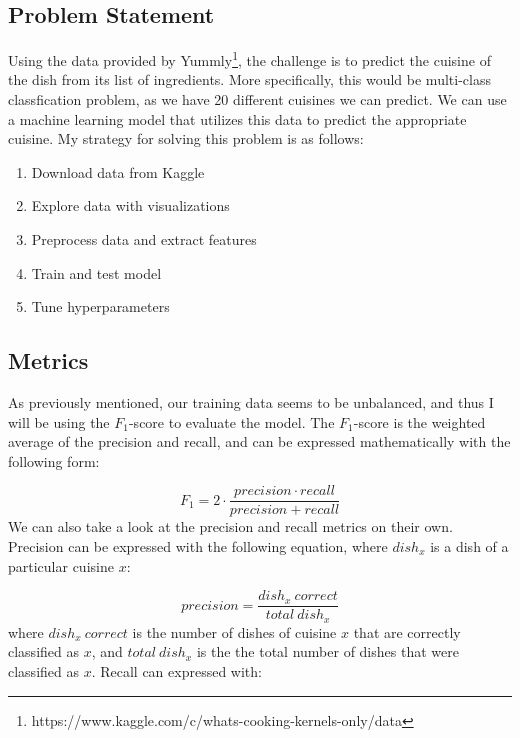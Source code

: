 \documentclass[12pt]{article}
\begin{document}
\subsection{Problem Statement}
Using the data provided by Yummly\footnote{https://www.kaggle.com/c/whats-cooking-kernels-only/data}, the challenge is to predict the cuisine of the dish from its list of ingredients. More specifically, this would be multi-class classfication problem, as we have 20 different cuisines we can predict. We can use a machine learning model that utilizes this data to predict the appropriate cuisine.
\newline
\newline
%
My strategy for solving this problem is as follows:
\begin{enumerate}[label*=\arabic*.]
\item Download data from Kaggle
\item Explore data with visualizations
\item Preprocess data and extract features
\item Train and test model
\item Tune hyperparameters
\end{enumerate}

\subsection{Metrics}
As previously mentioned, our training data seems to be unbalanced, and thus I will be using the $F_1$-score to evaluate the model. The $F_1$-score is the weighted average of the precision and recall, and can be expressed mathematically with the following form:

\begin{equation}
F_1 = 2 \cdot \frac{precision \cdot recall}{precision+recall}
\end{equation}
%
We can also take a look at the precision and recall metrics on their own. Precision can be expressed with the following equation, where $dish_x$ is a dish of a particular cuisine $x$:

\begin{equation}
precision = \frac{\textit{$dish_x\: correct$}}{\textit{$total\: dish_x$}}
\end{equation}
%
where $dish_x\: correct$ is the number of dishes of cuisine $x$ that are correctly classified as $x$, and $total\: dish_x$ is the the total number of dishes that were classified as $x$.
\newline
\newline
%
Recall can expressed with:
\end{document}

